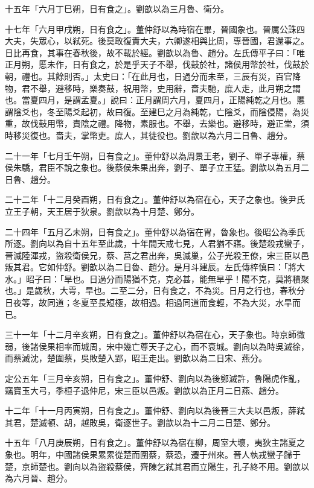 \begin{pinyinscope}
十五年「六月丁巳朔，日有食之」。劉歆以為三月魯、衛分。

十七年「六月甲戌朔，日有食之」。董仲舒以為時宿在畢，晉國象也。晉厲公誅四大夫，失眾心，以弒死。後莫敢復責大夫，六卿遂相與比周，專晉國，君還事之。日比再食，其事在春秋後，故不載於經。劉歆以為魯、趙分。左氏傳平子曰：「唯正月朔，慝未作，日有食之，於是乎天子不舉，伐鼓於社，諸侯用幣於社，伐鼓於朝，禮也。其餘則否。」太史曰：「在此月也，日過分而未至，三辰有災，百官降物，君不舉，避移時，樂奏鼓，祝用幣，史用辭，嗇夫馳，庶人走，此月朔之謂也。當夏四月，是謂孟夏。」說曰：正月謂周六月，夏四月，正陽純乾之月也。慝謂陰爻也，冬至陽爻起初，故曰復。至建巳之月為純乾，亡陰爻，而陰侵陽，為災重，故伐鼓用幣，責陰之禮。降物，素服也。不舉，去樂也。避移時，避正堂，須時移災復也。嗇夫，掌幣吏。庶人，其徒役也。劉歆以為六月二日魯、趙分。

二十一年「七月壬午朔，日有食之」。董仲舒以為周景王老，劉子、單子專權，蔡侯朱驕，君臣不說之象也。後蔡侯朱果出奔，劉子、單子立王猛。劉歆以為五月二日魯、趙分。

二十二年「十二月癸酉朔，日有食之」。董仲舒以為宿在心，天子之象也。後尹氏立王子朝，天王居于狄泉。劉歆以為十月楚、鄭分。

二十四年「五月乙未朔，日有食之」。董仲舒以為宿在胃，魯象也。後昭公為季氏所逐。劉向以為自十五年至此歲，十年間天戒七見，人君猶不寤。後楚殺戎蠻子，晉滅陸渾戎，盜殺衛侯兄，蔡、莒之君出奔，吳滅巢，公子光殺王僚，宋三臣以邑叛其君。它如仲舒。劉歆以為二日魯、趙分。是月斗建辰。左氏傳梓慎曰：「將大水。」昭子曰：「旱也。日過分而陽猶不克，克必甚，能無旱乎！陽不克，莫將積聚也。」是歲秋，大雩，旱也。二至二分，日有食之，不為災。日月之行也，春秋分日夜等，故同道；冬夏至長短極，故相過。相過同道而食輕，不為大災，水旱而已。

三十一年「十二月辛亥朔，日有食之」。董仲舒以為宿在心，天子象也。時京師微弱，後諸侯果相率而城周，宋中幾亡尊天子之心，而不衰城。劉向以為時吳滅徐，而蔡滅沈，楚圍蔡，吳敗楚入郢，昭王走出。劉歆以為二日宋、燕分。

定公五年「三月辛亥朔，日有食之」。董仲舒、劉向以為後鄭滅許，魯陽虎作亂，竊寶玉大弓，季桓子退仲尼，宋三臣以邑叛。劉歆以為正月二日燕、趙分。

十二年「十一月丙寅朔，日有食之」。董仲舒、劉向以為後晉三大夫以邑叛，薛弒其君，楚滅頓、胡，越敗吳，衛逐世子。劉歆以為十二月二日楚、鄭分。

十五年「八月庚辰朔，日有食之」。董仲舒以為宿在柳，周室大壞，夷狄主諸夏之象也。明年，中國諸侯果累累從楚而圍蔡，蔡恐，遷于州來。晉人執戎蠻子歸于楚，京師楚也。劉向以為盜殺蔡侯，齊陳乞弒其君而立陽生，孔子終不用。劉歆以為六月晉、趙分。


\end{pinyinscope}
